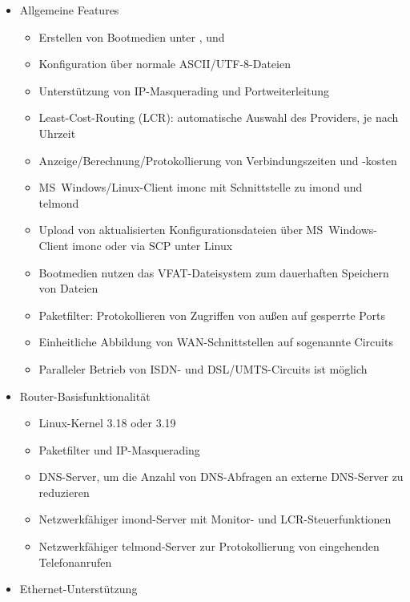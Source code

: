 \begin{itemize}

\item Allgemeine Features

\begin{itemize}
\item Erstellen von Bootmedien unter ,
       und
\item Konfiguration über normale ASCII/UTF-8-Dateien
\item Unterstützung von IP-Masquerading und Portweiterleitung
\item Least-Cost-Routing (LCR): automatische Auswahl des Providers, je nach
      Uhrzeit
\item Anzeige/Berechnung/Protokollierung von Verbindungszeiten und -kosten
\item MS~Windows/Linux-Client imonc mit Schnittstelle zu imond und telmond
\item Upload von aktualisierten Konfigurationsdateien über MS~Windows-Client
      imonc oder via SCP unter Linux
\item Bootmedien nutzen das VFAT-Dateisystem zum dauerhaften Speichern von
      Dateien
\item Paketfilter: Protokollieren von Zugriffen von außen auf gesperrte Ports
\item Einheitliche Abbildung von WAN-Schnittstellen auf sogenannte Circuits
\item Paralleler Betrieb von ISDN- und DSL/UMTS-Circuits ist möglich
\end{itemize}

\item Router-Basisfunktionalität

\begin{itemize}
\item Linux-Kernel 3.18 oder 3.19
\item Paketfilter und IP-Masquerading
\item DNS-Server, um die Anzahl von DNS-Abfragen an externe DNS-Server zu
      reduzieren
\item Netzwerkfähiger imond-Server mit Monitor- und LCR-Steuerfunktionen
\item Netzwerkfähiger telmond-Server zur Protokollierung von eingehenden
      Telefonanrufen
\end{itemize}

\item Ethernet-Unterstützung


\end{itemize}
